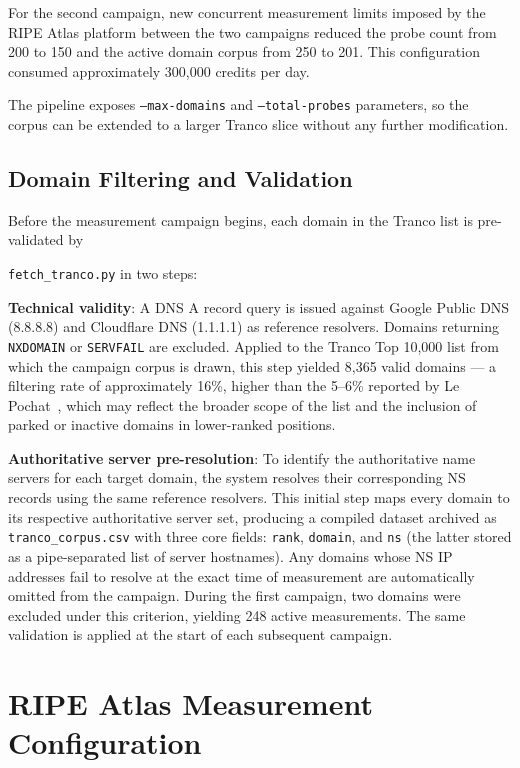For the second campaign, new concurrent measurement limits imposed by the RIPE Atlas platform between the two campaigns reduced the probe count from 200 to 150 and the active domain corpus from 250 to 201. This configuration consumed approximately 300,000 credits per day.

The pipeline exposes \texttt{--max-domains} and \texttt{--total-probes} parameters, so the corpus can be extended to a larger Tranco slice without any further modification.

\subsection{Domain Filtering and Validation}
\label{subsec:3.2.3}

Before the measurement campaign begins, each domain in the Tranco list is pre-validated by 

\texttt{fetch\_tranco.py} in two steps:

\textbf{Technical validity}: A \ac{DNS} \ac{A} record query is issued against Google Public \ac{DNS} (8.8.8.8) and Cloudflare \ac{DNS} (1.1.1.1) as reference resolvers. Domains returning \texttt{NXDOMAIN} or \texttt{SERVFAIL} are excluded. Applied to the Tranco Top 10,000 list from which the campaign corpus is drawn, this step yielded 8,365 valid domains --- a filtering rate of approximately 16\%, higher than the 5--6\% reported by Le Pochat~\cite{LePochat2019}, which may reflect the broader scope of the list and the inclusion of parked or inactive domains in lower-ranked positions.

\textbf{Authoritative server pre-resolution}: To identify the authoritative name servers for each target domain, the system resolves their corresponding \ac{NS} records using the same reference resolvers. This initial step maps every domain to its respective authoritative server set, producing a compiled dataset archived as \texttt{tranco\_corpus.csv} with three core fields: \texttt{rank}, \texttt{domain}, and \texttt{ns} (the latter stored as a pipe-separated list of server hostnames). Any domains whose \ac{NS} \ac{IP} addresses fail to resolve at the exact time of measurement are automatically omitted from the campaign. During the first campaign, two domains were excluded under this criterion, yielding 248 active measurements. The same validation is applied at the start of each subsequent campaign.

\section{RIPE Atlas Measurement Configuration}
\label{sec:3.3}

